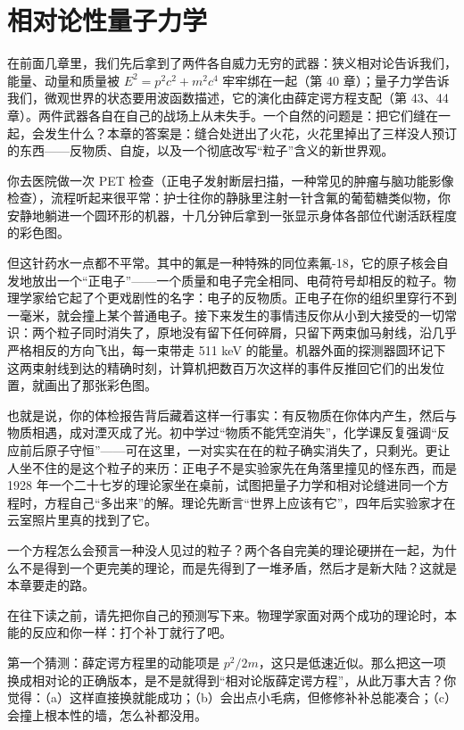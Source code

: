 \chapter{相对论性量子力学}

在前面几章里，我们先后拿到了两件各自威力无穷的武器：狭义相对论告诉我们，能量、动量和质量被 \(E^2=p^2c^2+m^2c^4\) 牢牢绑在一起（第 40 章）；量子力学告诉我们，微观世界的状态要用波函数描述，它的演化由薛定谔方程支配（第 43、44 章）。两件武器各自在自己的战场上从未失手。一个自然的问题是：把它们缝在一起，会发生什么？本章的答案是：缝合处迸出了火花，火花里掉出了三样没人预订的东西——反物质、自旋，以及一个彻底改写“粒子”含义的新世界观。


你去医院做一次 PET 检查（正电子发射断层扫描，一种常见的肿瘤与脑功能影像检查），流程听起来很平常：护士往你的静脉里注射一针含氟的葡萄糖类似物，你安静地躺进一个圆环形的机器，十几分钟后拿到一张显示身体各部位代谢活跃程度的彩色图。

但这针药水一点都不平常。其中的氟是一种特殊的同位素氟-18，它的原子核会自发地放出一个“正电子”——一个质量和电子完全相同、电荷符号却相反的粒子。物理学家给它起了个更戏剧性的名字：电子的反物质。正电子在你的组织里穿行不到一毫米，就会撞上某个普通电子。接下来发生的事情违反你从小到大接受的一切常识：两个粒子同时消失了，原地没有留下任何碎屑，只留下两束伽马射线，沿几乎严格相反的方向飞出，每一束带走 511 keV 的能量。机器外面的探测器圆环记下这两束射线到达的精确时刻，计算机把数百万次这样的事件反推回它们的出发位置，就画出了那张彩色图。

也就是说，你的体检报告背后藏着这样一行事实：有反物质在你体内产生，然后与物质相遇，成对湮灭成了光。初中学过“物质不能凭空消失”，化学课反复强调“反应前后原子守恒”——可在这里，一对实实在在的粒子确实消失了，只剩光。更让人坐不住的是这个粒子的来历：正电子不是实验家先在角落里撞见的怪东西，而是 1928 年一个二十七岁的理论家坐在桌前，试图把量子力学和相对论缝进同一个方程时，方程自己“多出来”的解。理论先断言“世界上应该有它”，四年后实验家才在云室照片里真的找到了它。

一个方程怎么会预言一种没人见过的粒子？两个各自完美的理论硬拼在一起，为什么不是得到一个更完美的理论，而是先得到了一堆矛盾，然后才是新大陆？这就是本章要走的路。


在往下读之前，请先把你自己的预测写下来。物理学家面对两个成功的理论时，本能的反应和你一样：打个补丁就行了吧。

第一个猜测：薛定谔方程里的动能项是 \(p^2/2m\)，这只是低速近似。那么把这一项换成相对论的正确版本，是不是就得到“相对论版薛定谔方程”，从此万事大吉？你觉得：（a）这样直接换就能成功；（b）会出点小毛病，但修修补补总能凑合；（c）会撞上根本性的墙，怎么补都没用。

